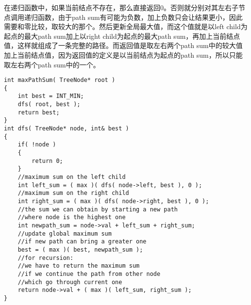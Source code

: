 在递归函数中，如果当前结点不存在，那么直接返回0。否则就分别对其左右子节点调用递归函数，由于path sum有可能为负数，加上负数只会让结果更小，因此需要和零比较，取较大的那个。然后更新全局最大值，而这个值就是以left child为起点的最大path sum加上以right child为起点的最大path sum，再加上当前结点值，这样就组成了一条完整的路径。而返回值是取左右两个path sum中的较大值加上当前结点值，因为返回值的定义是以当前结点为起点的path sum，所以只能取左右两个path sum中的一个。

\setcounter{lstlisting}{0}
\begin{lstlisting}[style=customc, caption={Recursion}]
int maxPathSum( TreeNode* root )
{
    int best = INT_MIN;
    dfs( root, best );
    return best;
}
int dfs( TreeNode* node, int& best )
{
    if( !node )
    {
        return 0;
    }
    //maximum sum on the left child
    int left_sum = ( max )( dfs( node->left, best ), 0 );
    //maximum sum on the right child
    int right_sum = ( max )( dfs( node->right, best ), 0 );
    //the sum we can obtain by starting a new path
    //where node is the highest one
    int newpath_sum = node->val + left_sum + right_sum;
    //update global maximum sum
    //if new path can bring a greater one
    best = ( max )( best, newpath_sum );
    //for recursion:
    //we have to return the maximum sum
    //if we continue the path from other node
    //which go through current one
    return node->val + ( max )( left_sum, right_sum );
}
\end{lstlisting}